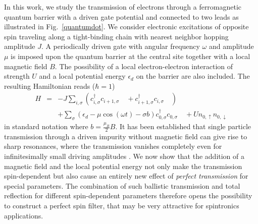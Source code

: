 \documentclass[aps,twocolumn,showpacs,floatfix,prl]{revtex4}
\newcommand{\bea}{\begin{eqnarray}}
\newcommand{\eea}{\end{eqnarray}}
\begin{document}
{ In this work, we study the transmission of electrons through a ferromagnetic quantum barrier
with a driven gate potential and 
connected to two leads as illustrated in Fig.~\ref{quantumdot}.   }
We consider electronic excitations of opposite spin traveling along a tight-binding chain with nearest neighbor hopping amplitude $J$. 
A periodically driven gate with angular frequency $\omega$ and amplitude $\mu$ is imposed 
upon the quantum barrier at the central site { together with a local
magnetic field $B$.} The possibility of a local electron-electron interaction of strength $U$ 
{and a local potential energy $\epsilon_d$ on the barrier}
are also included. The resulting Hamiltonian reads ($\hbar=1$)
\bea
\label{Eq:Hamiltonian}
H &=& -J \sum_{i,\sigma} (c_{i,\sigma}^\dagger c_{i+1,\sigma}{\phantom{\dagger}} + c_{i+1,\sigma}^\dagger c_{i,\sigma}{\phantom{\dagger}}) \\ 
&&+ \sum_{\sigma}\left(\epsilon_d -\mu \cos (\omega t) -\sigma b \right) c_{0,\sigma}^\dagger c_{0,\sigma}{\phantom{\dagger}} + U n_{0, \uparrow} n_{0, \downarrow}\nonumber
\eea
{in standard notation where $b=\frac{\mu_B}{2} B$.
It has been established that single
particle transmission through a driven impurity without magnetic field can give 
rise to sharp resonances, where the transmission vanishes completely even for 
infinitesimally small driving amplitudes \cite{reyes2017transport,thuberg2016quantum}.  We now show that the addition of a 
magnetic field and the local
potential energy not only make the transmission spin-dependent but 
also cause an entirely new 
effect of  {\it perfect transmission} for special parameters.
The combination of such ballistic transmission and total 
reflection for different spin-dependent parameters therefore 
opens the possibility to construct a perfect spin filter,} 
that may be very attractive for spintronics applications. 
\end{document}
